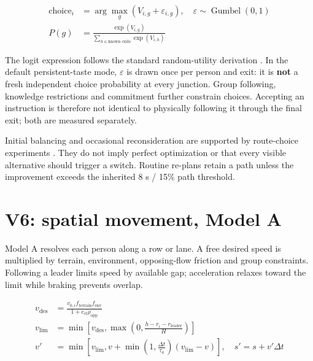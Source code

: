 \documentclass[11pt,a4paper]{article}
\begin{document}
\begin{equation}
\begin{aligned}
\operatorname{choice}_i&=\arg\max_g(V_{i,g}+\varepsilon_{i,g}),\quad \varepsilon\sim\operatorname{Gumbel}(0,1) \\
P(g)&=\frac{\exp(V_{i,g})}{\sum_{h\in\text{known exits}}\exp(V_{i,h})}
\end{aligned}
\tag{11}\label{eq:11}
\end{equation}

The logit expression follows the standard random-utility derivation \cite{R3}. In the default persistent-taste mode, \ensuremath{\varepsilon} is drawn once per person and exit: it is \textbf{not} a fresh independent choice probability at every junction. Group following, knowledge restrictions and commitment further constrain choices. Accepting an instruction is therefore not identical to physically following it through the final exit; both are measured separately.


Initial balancing and occasional reconsideration are supported by route-choice experiments \cite{R7}. They do not imply perfect optimization or that every visible alternative should trigger a switch. Routine re-plans retain a path unless the improvement exceeds the inherited 8 s / 15\% path threshold.


\section{V6: spatial movement, Model A}\label{sec:8}

Model A resolves each person along a row or lane. A free desired speed is multiplied by terrain, environment, opposing-flow friction and group constraints. Following a leader limits speed by available gap; acceleration relaxes toward the limit while braking prevents overlap.


\begin{equation}
\begin{aligned}
v_{\mathrm{des}}&=\frac{v_{0,i}f_{\mathrm{terrain}}f_{\mathrm{env}}}{1+c_{\mathrm{cf}}\rho_{\mathrm{opp}}} \\
v_{\mathrm{lim}}&=\min\!\left[v_{\mathrm{des}},\max\!\left(0,\frac{h-r_i-r_{\mathrm{leader}}}{H}\right)\right] \\
v'&=\min\!\left[v_{\mathrm{lim}},v+\min\!\left(1,\frac{\Delta t}{\tau_a}\right)(v_{\mathrm{lim}}-v)\right],\quad s'=s+v'\Delta t
\end{aligned}
\tag{12}\label{eq:12}
\end{equation}
\end{document}
